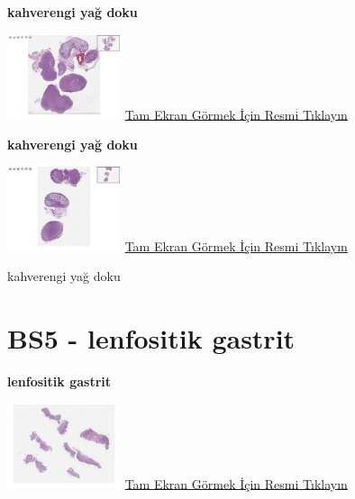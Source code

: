 \documentclass[
  letterpaper,
  DIV=11,
  numbers=noendperiod]{scrreprt}
\begin{document}
\textbf{kahverengi yağ doku}

\href{https://images.patolojiatlasi.com/BS4/HE1.html}{\includegraphics[width=0.25\textwidth,height=\textheight]{./screenshots/thumbnail_BS4-HE1.png}}
\href{https://images.patolojiatlasi.com/BS4/HE1.html}{Tam Ekran Görmek
İçin Resmi Tıklayın}

\textbf{kahverengi yağ doku}

\href{https://images.patolojiatlasi.com/BS4/HE2.html}{\includegraphics[width=0.25\textwidth,height=\textheight]{./screenshots/thumbnail_BS4-HE2.png}}
\href{https://images.patolojiatlasi.com/BS4/HE2.html}{Tam Ekran Görmek
İçin Resmi Tıklayın}

\begin{tcolorbox}[enhanced jigsaw, breakable, opacitybacktitle=0.6, arc=.35mm, colbacktitle=quarto-callout-tip-color!10!white, colback=white, toptitle=1mm, left=2mm, opacityback=0, colframe=quarto-callout-tip-color-frame, titlerule=0mm, rightrule=.15mm, bottomrule=.15mm, toprule=.15mm, bottomtitle=1mm, title=\textcolor{quarto-callout-tip-color}{\faLightbulb}\hspace{0.5em}{Tanı}, coltitle=black, leftrule=.75mm]

kahverengi yağ doku

\end{tcolorbox}

\hypertarget{sec-BS5}{%
\section{BS5 - lenfositik gastrit}\label{sec-BS5}}

\textbf{lenfositik gastrit}

\href{https://images.patolojiatlasi.com/BS5/HE.html}{\includegraphics[width=0.25\textwidth,height=\textheight]{./screenshots/thumbnail_BS5-HE.png}}
\href{https://images.patolojiatlasi.com/BS5/HE.html}{Tam Ekran Görmek
İçin Resmi Tıklayın}
\end{document}
